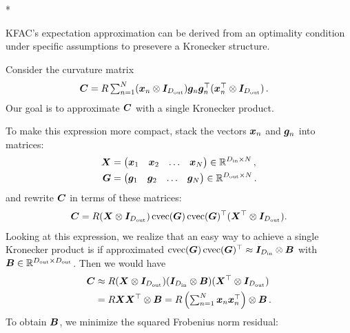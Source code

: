 \switchcolumn[1]*
\begin{example}
  \label{ex:just_kfac_exp_approx}
  KFAC's expectation approximation can be derived from an optimality condition under specific assumptions to presevere a Kronecker structure.

  Consider the curvature matrix
  \begin{align*}
    {\bm{C}}
    &=
      \textstyle
      R \sum_{n=1}^N
      ({\bm{x}}_n \otimes {\bm{I}}_{D_{\text{out}}})
      {\bm{g}}_n {\bm{g}}_n^{\top}
      ({\bm{x}}_n^{\top} \otimes {\bm{I}}_{D_{\text{out}}})\,.
  \end{align*}
  Our goal is to approximate ${\bm{C}}$ with a single Kronecker product.

  To make this expression more compact, stack the vectors ${\bm{x}}_n$ and ${\bm{g}}_n$ into matrices:
  \begin{align*}
    {\bm{X}}
    &=
      \begin{pmatrix}
        {\bm{x}}_1 & {\bm{x}}_2 & \ldots & {\bm{x}}_N
      \end{pmatrix}
      \in {\mathbb{R}}^{D_{\text{in}} \times N}\,,
    \\
    {\bm{G}}
    &=
      \begin{pmatrix}
        {\bm{g}}_1 & {\bm{g}}_2 & \ldots & {\bm{g}}_N
      \end{pmatrix}
      \in {\mathbb{R}}^{D_{\text{out}} \times N}\,.
  \end{align*}
  and rewrite ${\bm{C}}$ in terms of these matrices:
  \begin{align*}
    {\bm{C}} = R ({\bm{X}} \otimes {\bm{I}}_{D_{\text{out}}}) \operatorname{cvec}({\bm{G}}) \operatorname{cvec}({\bm{G}})^{\top}({\bm{X}}^{\top} \otimes {\bm{I}}_{D_{\text{out}}}).
  \end{align*}
  Looking at this expression, we realize that an easy way to achieve a single Kronecker product is if approximated $\operatorname{cvec}({\bm{G}}) \operatorname{cvec}({\bm{G}})^{\top} \approx {\bm{I}}_{D_{\text{in}}} \otimes {\bm{B}}$ with ${\bm{B}} \in {\mathbb{R}}^{D_{\text{out}}\times D_{\text{out}}}$.
  Then we would have
  \begin{align*}
    {\bm{C}}
    &\approx
      R ({\bm{X}} \otimes {\bm{I}}_{D_{\text{out}}})
      ({\bm{I}}_{D_{\text{in}}} \otimes {\bm{B}})
      ({\bm{X}}^{\top} \otimes {\bm{I}}_{D_{\text{out}}})
    \\
    &=
      R {\bm{X}} {\bm{X}}^{\top} \otimes {\bm{B}}
      =
      \textstyle
      R \left(\sum_{n=1}^N {\bm{x}}_n {\bm{x}}_n^{\top}\right) \otimes {\bm{B}}\,.
  \end{align*}
  To obtain ${\bm{B}}$, we minimize the squared Frobenius norm residual:
  \begin{align*}
    \begin{split}

\end{split}
\end{align*}
\end{example}
